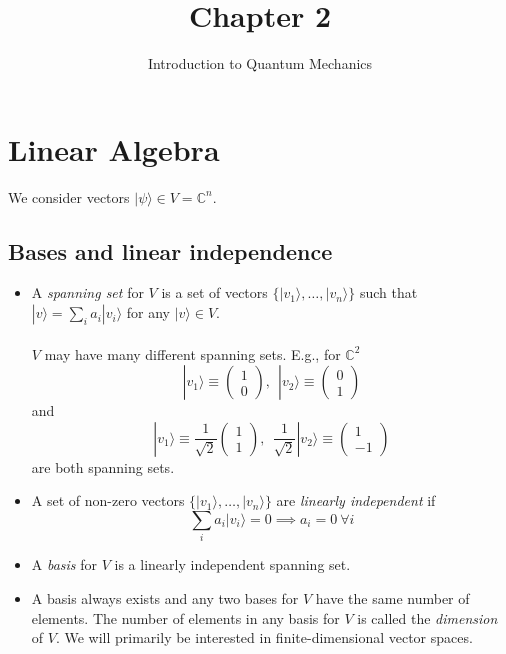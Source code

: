\documentclass[12 pt]{article}
\newcommand{\C}{\mathbb{C}}
\begin{document}
\title{Chapter 2}
\author{Introduction to Quantum Mechanics}
\date{}
\maketitle
\section{Linear Algebra}
We consider vectors $|\psi\rangle \in V=\C^n$.
\subsection{Bases and linear independence}
\begin{itemize}
	\item A \emph{spanning set} for $V$ is a set of vectors $\{|v_1\rangle,\dots,|v_n\rangle\}$ such that $|v\rangle=\sum_ia_i|v_i\rangle$ for any $|v\rangle \in V$. \\
	\\
	$V$ may have many different spanning sets. E.g., for $\C^2$
	$$|v_1\rangle \equiv \begin{pmatrix}
		1\\0
	\end{pmatrix}, \ \ |v_2\rangle \equiv \begin{pmatrix}
		0\\1
	\end{pmatrix}$$
	and 
	$$|v_1\rangle \equiv \frac{1}{\sqrt{2}}\begin{pmatrix}
		1\\1
	\end{pmatrix}, \ \ \frac{1}{\sqrt{2}}|v_2\rangle \equiv \begin{pmatrix}
		1\\-1
	\end{pmatrix}$$
	are both spanning sets.
	\item A set of non-zero vectors $\{|v_1\rangle,\dots,|v_n\rangle\}$ are \emph{linearly independent} if 
	$$\sum_i a_i|v_i\rangle =0 \implies a_i=0 \ \forall i$$
	\item A \emph{basis} for $V$ is a linearly independent spanning set. 
	\item A basis always exists and any two bases for $V$ have the same number of elements. The number of elements in any basis for $V$ is called the \emph{dimension} of $V$. We will primarily be interested in finite-dimensional vector spaces.
\end{itemize}
\end{document}
